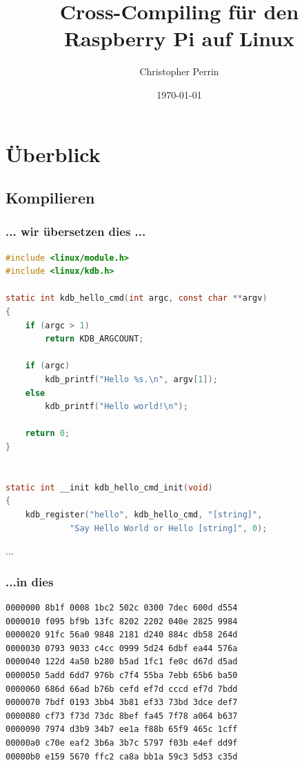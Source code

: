 \documentclass{beamer}
\begin{document}
\title{Cross-Compiling für den Raspberry Pi auf Linux}   
\author{Christopher Perrin} 
\date{\today} 

\frame{\titlepage} 


\section{Überblick}
\subsection{Kompilieren}



\begin{frame}[fragile]
\frametitle{... wir übersetzen dies ...}
\begin{lstlisting}[language=c, basicstyle=\tiny, tabsize=4, keywordstyle=\color{blue}, commentstyle=\color{green},stringstyle=\color{red}]
#include <linux/module.h>
#include <linux/kdb.h>

static int kdb_hello_cmd(int argc, const char **argv)
{
	if (argc > 1)
		return KDB_ARGCOUNT;

	if (argc)
		kdb_printf("Hello %s.\n", argv[1]);
	else
		kdb_printf("Hello world!\n");

	return 0;
}


static int __init kdb_hello_cmd_init(void)
{
	kdb_register("hello", kdb_hello_cmd, "[string]",
		     "Say Hello World or Hello [string]", 0);
\end{lstlisting}
...
\end{frame}

\begin{frame}[fragile]
\frametitle{...in dies}
\begin{center}
\begin{verbatim}
0000000 8b1f 0008 1bc2 502c 0300 7dec 600d d554
0000010 f095 bf9b 13fc 8202 2202 040e 2825 9984
0000020 91fc 56a0 9848 2181 d240 884c db58 264d
0000030 0793 9033 c4cc 0999 5d24 6dbf ea44 576a
0000040 122d 4a50 b280 b5ad 1fc1 fe0c d67d d5ad
0000050 5add 6dd7 976b c7f4 55ba 7ebb 65b6 ba50
0000060 686d 66ad b76b cefd ef7d cccd ef7d 7bdd
0000070 7bdf 0193 3bb4 3b81 ef33 73bd 3dce def7
0000080 cf73 f73d 73dc 8bef fa45 7f78 a064 b637
0000090 7974 d3b9 34b7 ee1a f88b 65f9 465c 1cff
00000a0 c70e eaf2 3b6a 3b7c 5797 f03b e4ef dd9f
00000b0 e159 5670 ffc2 ca8a bb1a 59c3 5d53 c35d
\end{verbatim}
\end{center}
\end{frame}
\end{document}
